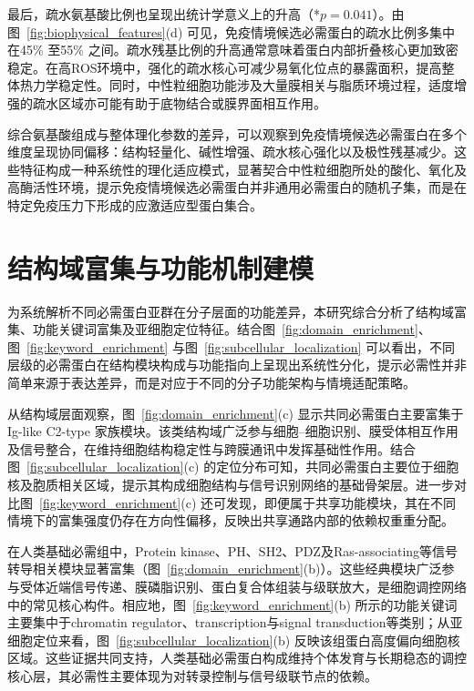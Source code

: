 最后，疏水氨基酸比例也呈现出统计学意义上的升高（*$p=0.041$）。由图~\ref{fig:biophysical_features}(d) 可见，免疫情境候选必需蛋白的疏水比例多集中在45\% 至55\% 之间。疏水残基比例的升高通常意味着蛋白内部折叠核心更加致密稳定。在高ROS环境中，强化的疏水核心可减少易氧化位点的暴露面积，提高整体热力学稳定性。同时，中性粒细胞功能涉及大量膜相关与脂质环境过程，适度增强的疏水区域亦可能有助于底物结合或膜界面相互作用。

综合氨基酸组成与整体理化参数的差异，可以观察到免疫情境候选必需蛋白在多个维度呈现协同偏移：结构轻量化、碱性增强、疏水核心强化以及极性残基减少。这些特征构成一种系统性的理化适应模式，显著契合中性粒细胞所处的酸化、氧化及高酶活性环境，提示免疫情境候选必需蛋白并非通用必需蛋白的随机子集，而是在特定免疫压力下形成的应激适应型蛋白集合。

\section{结构域富集与功能机制建模}

为系统解析不同必需蛋白亚群在分子层面的功能差异，本研究综合分析了结构域富集、功能关键词富集及亚细胞定位特征。结合图~\ref{fig:domain_enrichment}、图~\ref{fig:keyword_enrichment} 与图~\ref{fig:subcellular_localization} 可以看出，不同层级的必需蛋白在结构模块构成与功能指向上呈现出系统性分化，提示必需性并非简单来源于表达差异，而是对应于不同的分子功能架构与情境适配策略。

从结构域层面观察，图~\ref{fig:domain_enrichment}(c) 显示共同必需蛋白主要富集于 Ig-like C2-type 家族模块。该类结构域广泛参与细胞--细胞识别、膜受体相互作用及信号整合，在维持细胞结构稳定性与跨膜通讯中发挥基础性作用\cite{williams1988immunoglobulin}。结合图~\ref{fig:subcellular_localization}(c) 的定位分布可知，共同必需蛋白主要位于细胞核及胞质相关区域，提示其构成细胞结构与信号识别网络的基础骨架层。进一步对比图~\ref{fig:keyword_enrichment}(c) 还可发现，即便属于共享功能模块，其在不同情境下的富集强度仍存在方向性偏移，反映出共享通路内部的依赖权重重分配。

在人类基础必需组中，Protein kinase、PH、SH2、PDZ及Ras-associating等信号转导相关模块显著富集（图~\ref{fig:domain_enrichment}(b)）。这些经典模块广泛参与受体近端信号传递、膜磷脂识别、蛋白复合体组装与级联放大，是细胞调控网络中的常见核心构件\cite{pawson2003organization,manning2002kinome,lemmon2008membrane}。相应地，图~\ref{fig:keyword_enrichment}(b) 所示的功能关键词主要集中于chromatin regulator、transcription与signal transduction等类别；从亚细胞定位来看，图~\ref{fig:subcellular_localization}(b) 反映该组蛋白高度偏向细胞核区域。这些证据共同支持，人类基础必需蛋白构成维持个体发育与长期稳态的调控核心层，其必需性主要体现为对转录控制与信号级联节点的依赖。

